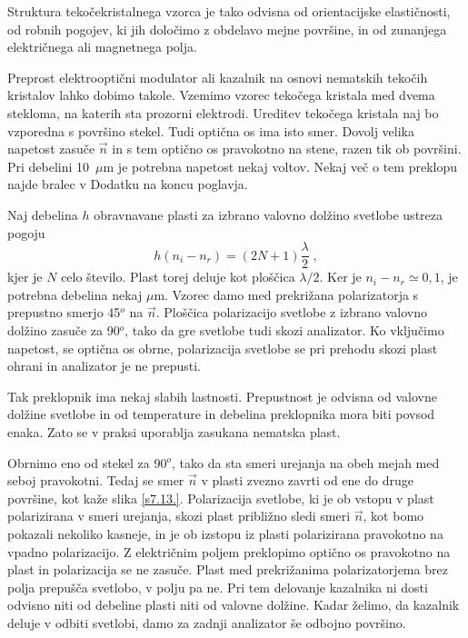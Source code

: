 Struktura tekočekristalnega vzorca je tako odvisna od orientacijske
elastičnosti, od robnih pogojev, ki jih določimo z obdelavo mejne
površine, in od zunanjega električnega ali magnetnega polja.

Preprost elektrooptični modulator ali kazalnik na osnovi nematskih
tekočih kristalov lahko dobimo takole. Vzemimo vzorec tekočega kristala
med dvema stekloma, na katerih sta prozorni elektrodi. Ureditev tekočega
kristala naj bo vzporedna s površino stekel. Tudi optična os ima isto
smer. Dovolj velika napetost zasuče $\vec{n}$ in s tem optično os
pravokotno na stene, razen tik ob površini. Pri debelini 10~$\mu$m
je potrebna napetost nekaj voltov. Nekaj več o tem preklopu najde
bralec v Dodatku na koncu poglavja.

Naj debelina $h$ obravnavane plasti za izbrano valovno dolžino svetlobe
ustreza pogoju 
\begin{equation}
h(n_{i}-n_{r})=(2N+1)\frac{\lambda}{2}\;,\label{7.57}
\end{equation}
 kjer je $N$ celo število. Plast torej deluje kot ploščica $\lambda/2$.
Ker je $n_{i}-n_{r}\simeq0,1$, je potrebna debelina nekaj $\mu$m.
Vzorec damo med prekrižana polarizatorja s prepustno smerjo 45$^{o}$
na $\vec{n}$. Ploščica polarizacijo svetlobe z izbrano valovno dolžino
zasuče za 90$^{o}$, tako da gre svetlobe tudi skozi analizator. Ko
vključimo napetost, se optična os obrne, polarizacija svetlobe se
pri prehodu skozi plast ohrani in analizator je ne prepusti.

Tak preklopnik ima nekaj slabih lastnosti. Prepustnost je odvisna
od valovne dolžine svetlobe in od temperature in debelina preklopnika
mora biti povsod enaka. Zato se v praksi uporablja zasukana nematska
plast.

Obrnimo eno od stekel za 90$^{o}$, tako da sta smeri urejanja na
obeh mejah med seboj pravokotni. Tedaj se smer $\vec{n}$ v plasti
zvezno zavrti od ene do druge površine, kot kaže slika \ref{s7.13.}.
Polarizacija svetlobe, ki je ob vstopu v plast polarizirana v smeri
urejanja, skozi plast približno sledi smeri $\vec{n}$, kot bomo pokazali
nekoliko kasneje, in je ob izstopu iz plasti polarizirana pravokotno
na vpadno polarizacijo. Z električnim poljem preklopimo optično os
pravokotno na plast in polarizacija se ne zasuče. Plast med prekrižanima
polarizatorjema brez polja prepušča svetlobo, v polju pa ne. Pri tem
delovanje kazalnika ni dosti odvisno niti od debeline plasti niti
od valovne dolžine. Kadar želimo, da kazalnik deluje v odbiti svetlobi,
damo za zadnji analizator še odbojno površino.

